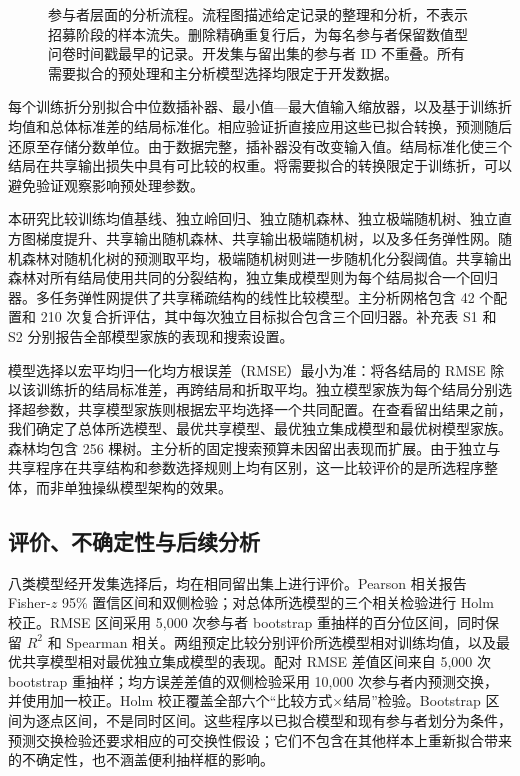 \begin{figure}[!htbp]
\centering
\caption{参与者层面的分析流程。流程图描述给定记录的整理和分析，不表示招募阶段的样本流失。删除精确重复行后，为每名参与者保留数值型问卷时间戳最早的记录。开发集与留出集的参与者 ID 不重叠。所有需要拟合的预处理和主分析模型选择均限定于开发数据。}\label{fig:flow}
\end{figure}

每个训练折分别拟合中位数插补器、最小值—最大值输入缩放器，以及基于训练折均值和总体标准差的结局标准化。相应验证折直接应用这些已拟合转换，预测随后还原至存储分数单位。由于数据完整，插补器没有改变输入值。结局标准化使三个结局在共享输出损失中具有可比较的权重。将需要拟合的转换限定于训练折，可以避免验证观察影响预处理参数\citep{kapoor2023}。

本研究比较训练均值基线、独立岭回归、独立随机森林、独立极端随机树、独立直方图梯度提升、共享输出随机森林、共享输出极端随机树，以及多任务弹性网。随机森林对随机化树的预测取平均，极端随机树则进一步随机化分裂阈值\citep{breiman2001,geurts2006}。共享输出森林对所有结局使用共同的分裂结构，独立集成模型则为每个结局拟合一个回归器。多任务弹性网提供了共享稀疏结构的线性比较模型。主分析网格包含 42 个配置和 210 次复合折评估，其中每次独立目标拟合包含三个回归器。补充表 S1 和 S2 分别报告全部模型家族的表现和搜索设置。

模型选择以宏平均归一化均方根误差（RMSE）最小为准：将各结局的 RMSE 除以该训练折的结局标准差，再跨结局和折取平均。独立模型家族为每个结局分别选择超参数，共享模型家族则根据宏平均选择一个共同配置。在查看留出结果之前，我们确定了总体所选模型、最优共享模型、最优独立集成模型和最优树模型家族。森林均包含 256 棵树。主分析的固定搜索预算未因留出表现而扩展。由于独立与共享程序在共享结构和参数选择规则上均有区别，这一比较评价的是所选程序整体，而非单独操纵模型架构的效果。

\subsection{评价、不确定性与后续分析}
八类模型经开发集选择后，均在相同留出集上进行评价。Pearson 相关报告 Fisher-$z$ 95\% 置信区间和双侧检验；对总体所选模型的三个相关检验进行 Holm 校正。RMSE 区间采用 5,000 次参与者 bootstrap 重抽样的百分位区间，同时保留 $R^2$ 和 Spearman 相关。两组预定比较分别评价所选模型相对训练均值，以及最优共享模型相对最优独立集成模型的表现。配对 RMSE 差值区间来自 5,000 次 bootstrap 重抽样；均方误差差值的双侧检验采用 10,000 次参与者内预测交换，并使用加一校正。Holm 校正覆盖全部六个“比较方式×结局”检验。Bootstrap 区间为逐点区间，不是同时区间。这些程序以已拟合模型和现有参与者划分为条件，预测交换检验还要求相应的可交换性假设；它们不包含在其他样本上重新拟合带来的不确定性，也不涵盖便利抽样框的影响。

